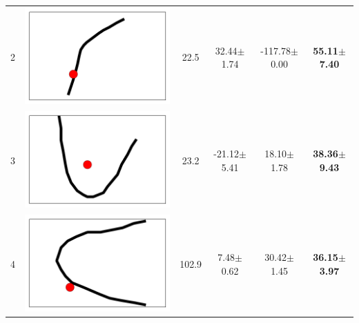 \begin{table}[t]
{\begin{tabular}{llcccc}
2  &  \includegraphics[height= \shapesize cm]{tps-experiments/shapes/pts_20.png} &        22.5 &           32.44$\pm$1.74 &         -117.78$\pm$0.00 &  \textbf{55.11$\pm$7.40} \\
3  &  \includegraphics[height= \shapesize cm]{tps-experiments/shapes/pts_12.png} &        23.2 &          -21.12$\pm$5.41 &           18.10$\pm$1.78 &  \textbf{38.36$\pm$9.43} \\
4  &  \includegraphics[height= \shapesize cm]{tps-experiments/shapes/pts_11.png} &       102.9 &            7.48$\pm$0.62 &           30.42$\pm$1.45 &  \textbf{36.15$\pm$3.97} \\

\end{tabular}}
\end{table}

